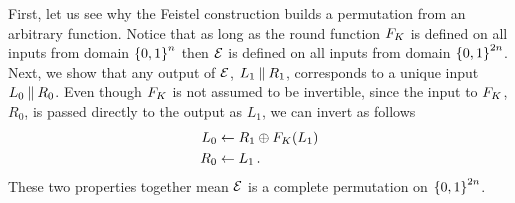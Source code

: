 \begin{example}
   First, let us see why the Feistel construction builds a permutation from an arbitrary function.
  Notice that as long as the round function $\prf_{\prfkey}$ is defined on all inputs from domain $\braces*{0,1}^n$ then $\cipher$ is defined on all inputs from domain $\braces*{0,1}^{2n}$.
  Next, we show that any output of $\cipher$, $L_1\concat R_1$, corresponds to a unique input $L_0\concat R_0$.
  Even though $\prf_{\prfkey}$ is not assumed to be invertible, since the input to $\prf_{\prfkey}$, $R_0$, is passed directly to the output as $L_1$, we can invert as follows
  \begin{align*}
    L_0 &\gets R_1\oplus \prf_{\prfkey}(L_1)\\
    R_0 &\gets L_1\,.
  \end{align*}
  These two properties together mean $\cipher$ is a complete permutation on $\braces*{0,1}^{2n}$.
\end{example}

